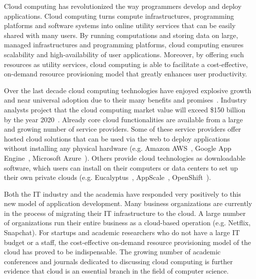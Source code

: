 Cloud computing has revolutionized the way programmers develop and deploy applications.
Cloud computing turns compute infrastructures, programming platforms and software systems
into online utility services that can be easily shared with many users.
By running computations and storing data on large, managed infrastructures and 
programming platforms, cloud computing ensures scalability and high-availability of 
user applications. Moreover, by offering such resources
as utility services, cloud computing is able to facilitate a cost-effective, on-demand
resource provisioning model that greatly enhances user productivity.

Over the last decade cloud computing technologies have enjoyed explosive growth 
and near universal adoption due to their many benefits and 
promises~\cite{Antonopoulos:2010:CCP:1855007,Pinheiro:2014:ACC:2618168.2618188}. 
Industry analysts project that the cloud computing market value will exceed \$150 billion
by the year 2020~\cite{cloud-growth}.
Already core cloud 
functionalities are available from a large and growing number of service providers. 
Some of these service providers offer hosted cloud solutions that can be used
via the web to deploy applications without installing any physical hardware 
(e.g. Amazon AWS~\cite{amazon-aws-web}, Google App Engine~\cite{gae}, Microsoft Azure~\cite{azure-web}). Others
provide cloud technologies as downloadable software, which users can install
on their computers or data centers to set up their own private clouds 
(e.g. Eucalyptus~\cite{eucalyptus09}, AppScale~\cite{6488671}, OpenShift~\cite{openshift}). 

Both the IT industry and the academia have responded very positively to this new 
model of application 
development. Many business organizations are currently in the process of migrating
their IT infrastructure to the cloud. A large number of organizations
run their entire business as a cloud-based operation (e.g. Netflix, Snapchat). For startups
and academic researchers who do not have a large IT budget or a staff, the cost-effective 
on-demand resource provisioning model of the cloud has proved to be indispensable.
The growing number of academic conferences and journals dedicated to discussing
cloud computing is further evidence that cloud is an essential branch in the field
of computer science.

